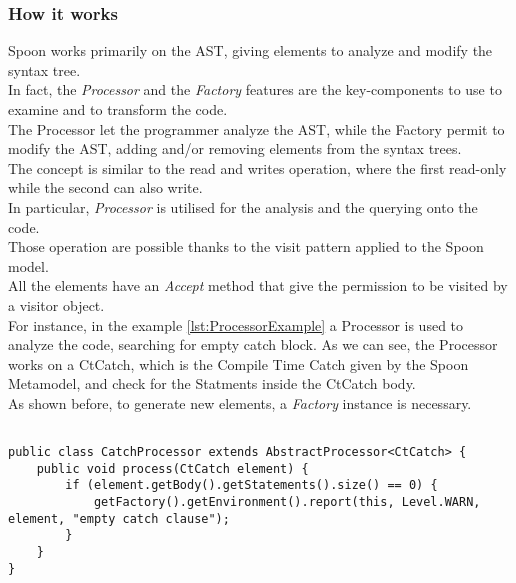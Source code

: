 \subsubsection{How it works}
Spoon works primarily on the AST, giving elements to analyze and modify the syntax tree.\\
In fact, the \emph{Processor} and the \emph{Factory} features are the key-components to use to examine and to transform the code.\\
The Processor let the programmer analyze the AST, while the Factory permit to modify the AST, adding and/or removing elements from the syntax trees.\\
The concept is similar to the read and writes operation, where the first read-only while the second can also write.\\
In particular, \emph{Processor} is utilised for the analysis and the querying onto the code.\\
Those operation are possible thanks to the visit pattern applied to the Spoon model.\\
All the elements have an \emph{Accept} method that give the permission to be visited by a visitor object.\\
For instance, in the example \ref{lst:ProcessorExample} a Processor is used to analyze the code, searching for empty catch block.
As we can see, the Processor works on a CtCatch, which is the Compile Time Catch given by the Spoon Metamodel, and check for the Statments inside the CtCatch body. \\
As shown before, to generate new elements, a \emph{Factory} instance is necessary. 
\lstset{language=Java}          %
\label{lst:ProcessorExample}
\begin{lstlisting}[caption={Processor example taken from \href{http://spoon.gforge.inria.fr/processor.html}{Spoon documentation}}]% Start your code-block

public class CatchProcessor extends AbstractProcessor<CtCatch> {
	public void process(CtCatch element) {
		if (element.getBody().getStatements().size() == 0) {
			getFactory().getEnvironment().report(this, Level.WARN, element, "empty catch clause");
		}
	}
}
\end{lstlisting}

